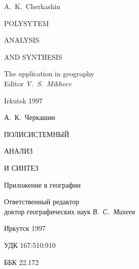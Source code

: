 \documentclass[draft,openany,14pt]{extbook}
\begin{document}

\begingroup
\thispagestyle{empty}
\mbox{}

\ptsans
\vspace{13ex}
\centering\large
\noindent{}A.~K.~Cherkashin

\vspace{6ex}

{\Huge\bfseries

POLYSYTEM

ANALYSIS

AND SYNTHESIS

}
\vspace{1em}

The application in geography
\\[0.7em]
{\normalsize{} Editor {\itshape{} V.~S.~Mikheev}}
\vfill{}

Irkutsk 1997
\mbox{}

\endgroup
\newpage
\begingroup
\mbox{}
\thispagestyle{empty}

\ptsans
\vspace{13ex}
\centering\large
\noindent{}А.~К.~Черкашин

\vspace{6ex}

{\Huge\bfseries

ПОЛИСИСТЕМНЫЙ

АНАЛИЗ

И СИНТЕЗ

}
\vspace{1em}

Приложение в географии
\vspace{1em}

{\normalsize\parskip0pt
Ответственный редактор\\[-0.5em] доктор географических наук {\itshape В.~С.~Михеев}}
\vfill{}

Иркутск 1997
\mbox{}

\endgroup
\newpage{}
\begingroup
\newcommand\sucopyright{{\ptserif\copyright}}
\newcommand\ISBN{ISBN 5--02--030607--X}
\thispagestyle{empty}
\noindent{}УДК 167:510:910

\noindent{}ББК 22.172

\vspace{2em}
\end{document}
